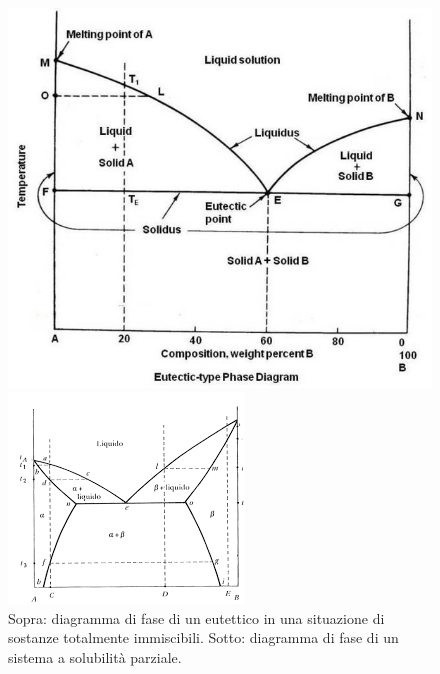 \begin{figure}[h]
\begin{minipage}[b]{0.5\linewidth}
\centering
    \includegraphics[width=\textwidth]{Diagrammi di fase/eutettico.jpg}
\end{minipage}

\begin{minipage}[b]{0.5\linewidth}
\centering
    \includegraphics[width=\textwidth]{Diagrammi di fase/partial_solub.png}
\end{minipage}

\label{eutettico}
\caption{Sopra: diagramma di fase di un eutettico in una situazione di sostanze totalmente immiscibili. Sotto: diagramma di fase di un sistema a solubilità parziale.}
\end{figure}

